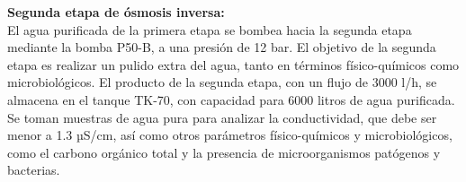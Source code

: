 \textbf{Segunda etapa de ósmosis inversa:}\\
El agua purificada de la primera etapa se bombea hacia la segunda etapa mediante la bomba P50-B, a una presión de 12 bar.
El objetivo de la segunda etapa es realizar un pulido extra del agua, tanto en términos físico-químicos como microbiológicos.
El producto de la segunda etapa, con un flujo de 3000 l/h, se almacena en el tanque TK-70, con capacidad para 6000 litros de agua purificada.
Se toman muestras de agua pura para analizar la conductividad, que debe ser menor a 1.3 µS/cm, así como otros parámetros físico-químicos y microbiológicos,
como el carbono orgánico total y la presencia de microorganismos patógenos y bacterias.

